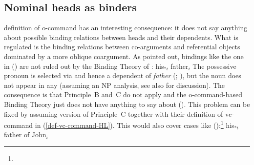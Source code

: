 \documentclass[output=paper
 	        ,biblatex
                ,babelshorthands
                ,newtxmath
                ,draftmode
                ,colorlinks, citecolor=brown
]{langscibook}
\begin{document}
\subsection{Nominal heads as binders}
\label{sec-nominal-heads-as-binders}


 definition of o-command has an interesting consequence: it does not say anything about possible
binding relations between heads and their dependents. What is regulated is the binding relations
between co-arguments and referential objects dominated by a more oblique coargument. As
\citet[]{Mueller99a} pointed out, bindings like the one in () are not ruled out by
the Binding Theory of \citet[Chapter~6]{ps2}: 
\ea
his$_{*i}$ father$_i$
\z
The possessive pronoun is selected via \spr and hence a dependent of \emph{father}
(\citealt{MuellerHeadless,MyPM2021a}; \crossrefchapteralt[\page \pageref{knjiga-avm}]{agreement}), but the noun does not appear in any \argstl (assuming an NP
analysis, see also  for discussion). The consequence is that Principle~B and~C do not apply and the o-command-based Binding Theory just
does not have anything to say about (). This problem can be fixed by assuming 
version of Principle~C together with their definition of vc-command in (\ref{def-vc-command-HL}).
This would also cover cases like ():\footnote{%
}
\ea
his$_{*i}$ father of John$_i$
\z
\end{document}
